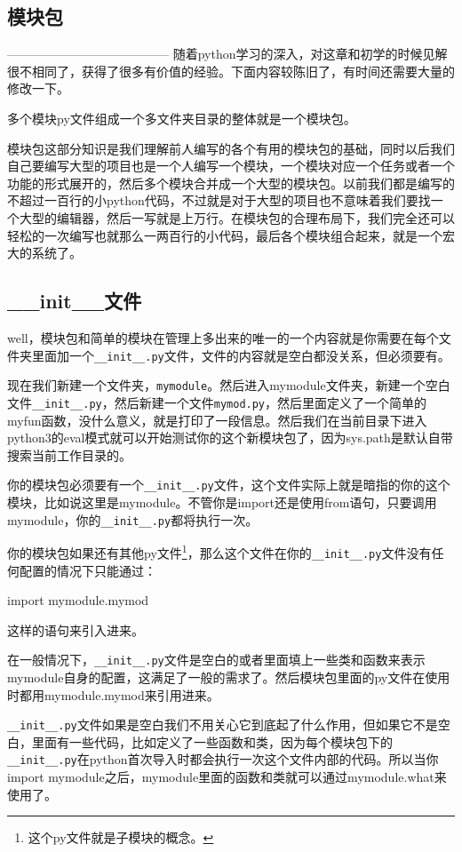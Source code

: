 \documentclass[12pt,oneside]{book}
\begin{document}
\begin{common-format}
\chapter{模块包}
---------------------------------------
随着python学习的深入，对这章和初学的时候见解很不相同了，获得了很多有价值的经验。下面内容较陈旧了，有时间还需要大量的修改一下。






多个模块py文件组成一个多文件夹目录的整体就是一个模块包。

模块包这部分知识是我们理解前人编写的各个有用的模块包的基础，同时以后我们自己要编写大型的项目也是一个人编写一个模块，一个模块对应一个任务或者一个功能的形式展开的，然后多个模块合并成一个大型的模块包。以前我们都是编写的不超过一百行的小python代码，不过就是对于大型的项目也不意味着我们要找一个大型的编辑器，然后一写就是上万行。在模块包的合理布局下，我们完全还可以轻松的一次编写也就那么一两百行的小代码，最后各个模块组合起来，就是一个宏大的系统了。

\section{\_{}\_{}init\_{}\_{}文件}
well，模块包和简单的模块在管理上多出来的唯一的一个内容就是你需要在每个文件夹里面加一个\verb+__init__.py+文件，文件的内容就是空白都没关系，但必须要有。

现在我们新建一个文件夹，\verb+mymodule+。然后进入mymodule文件夹，新建一个空白文件\verb+__init__.py+，然后新建一个文件\verb+mymod.py+，然后里面定义了一个简单的myfun函数，没什么意义，就是打印了一段信息。然后我们在当前目录下进入python3的eval模式就可以开始测试你的这个新模块包了，因为sys.path是默认自带搜索当前工作目录的。

你的模块包必须要有一个\verb+__init__.py+文件，这个文件实际上就是暗指的你的这个模块，比如说这里是mymodule。不管你是import还是使用from语句，只要调用mymodule，你的\verb+__init__.py+都将执行一次。

你的模块包如果还有其他py文件\footnote{这个py文件就是子模块的概念。}，那么这个文件在你的\verb+__init__.py+文件没有任何配置的情况下只能通过：
\begin{tcbpython}[]
import mymodule.mymod
\end{tcbpython}
这样的语句来引入进来。

在一般情况下，\verb+__init__.py+文件是空白的或者里面填上一些类和函数来表示mymodule自身的配置，这满足了一般的需求了。然后模块包里面的py文件在使用时都用mymodule.mymod来引用进来。

\verb+__init__.py+文件如果是空白我们不用关心它到底起了什么作用，但如果它不是空白，里面有一些代码，比如定义了一些函数和类，因为每个模块包下的\verb+__init__.py+在python首次导入时都会执行一次这个文件内部的代码。所以当你import mymodule之后，mymodule里面的函数和类就可以通过mymodule.what来使用了。


\end{common-format}
\end{document}
